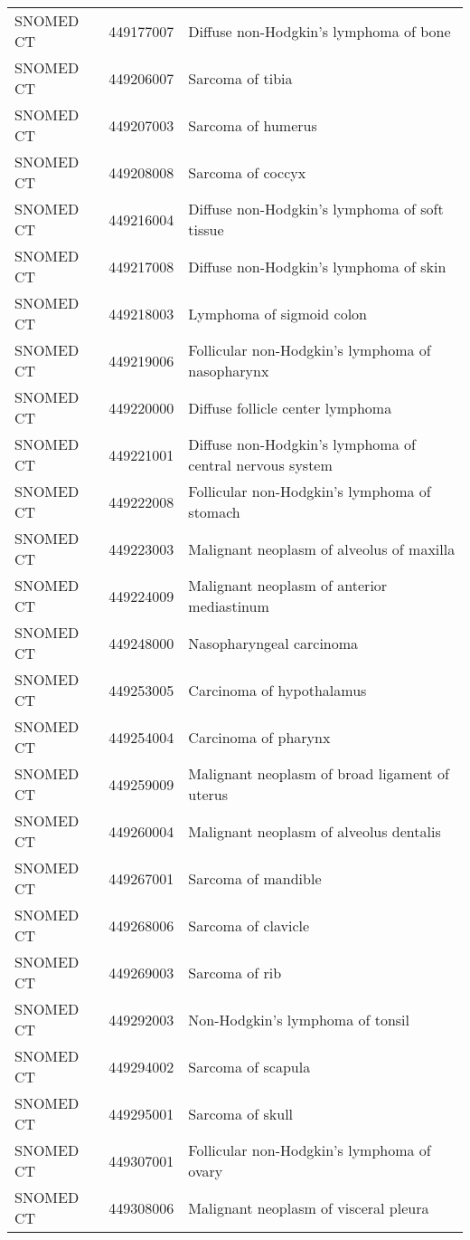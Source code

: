 \begin{longtable}{p{}p{}p{}}
  SNOMED CT & 449177007 & Diffuse non-Hodgkin's lymphoma of bone \\ 
  SNOMED CT & 449206007 & Sarcoma of tibia \\ 
  SNOMED CT & 449207003 & Sarcoma of humerus \\ 
  SNOMED CT & 449208008 & Sarcoma of coccyx \\ 
  SNOMED CT & 449216004 & Diffuse non-Hodgkin's lymphoma of soft tissue \\ 
  SNOMED CT & 449217008 & Diffuse non-Hodgkin's lymphoma of skin \\ 
  SNOMED CT & 449218003 & Lymphoma of sigmoid colon \\ 
  SNOMED CT & 449219006 & Follicular non-Hodgkin's lymphoma of nasopharynx \\ 
  SNOMED CT & 449220000 & Diffuse follicle center lymphoma \\ 
  SNOMED CT & 449221001 & Diffuse non-Hodgkin's lymphoma of central nervous system \\ 
  SNOMED CT & 449222008 & Follicular non-Hodgkin's lymphoma of stomach \\ 
  SNOMED CT & 449223003 & Malignant neoplasm of alveolus of maxilla \\ 
  SNOMED CT & 449224009 & Malignant neoplasm of anterior mediastinum \\ 
  SNOMED CT & 449248000 & Nasopharyngeal carcinoma \\ 
  SNOMED CT & 449253005 & Carcinoma of hypothalamus \\ 
  SNOMED CT & 449254004 & Carcinoma of pharynx \\ 
  SNOMED CT & 449259009 & Malignant neoplasm of broad ligament of uterus \\ 
  SNOMED CT & 449260004 & Malignant neoplasm of alveolus dentalis \\ 
  SNOMED CT & 449267001 & Sarcoma of mandible \\ 
  SNOMED CT & 449268006 & Sarcoma of clavicle \\ 
  SNOMED CT & 449269003 & Sarcoma of rib \\ 
  SNOMED CT & 449292003 & Non-Hodgkin's lymphoma of tonsil \\ 
  SNOMED CT & 449294002 & Sarcoma of scapula \\ 
  SNOMED CT & 449295001 & Sarcoma of skull \\ 
  SNOMED CT & 449307001 & Follicular non-Hodgkin's lymphoma of ovary \\ 
  SNOMED CT & 449308006 & Malignant neoplasm of visceral pleura \\ 

\end{longtable}

